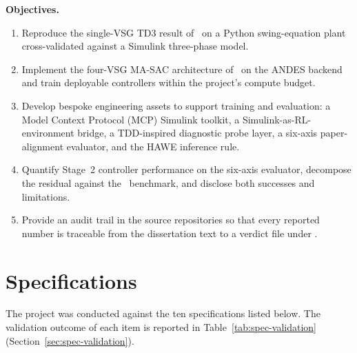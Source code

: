\documentclass{unnc-fyp}
\begin{document}
\textbf{Objectives.}
\begin{enumerate}
  \item Reproduce the single-VSG TD3 result
        of~\cite{benhmidouch2024td3} on a Python swing-equation
        plant cross-validated against a Simulink three-phase
        model.
  \item Implement the four-VSG MA-SAC architecture
        of~\cite{yang2023ddic} on the ANDES backend and train
        deployable controllers within the project's compute
        budget.
  \item Develop bespoke engineering assets to support training
        and evaluation: a Model Context Protocol (MCP) Simulink
        toolkit, a Simulink-as-RL-environment bridge, a
        TDD-inspired diagnostic probe layer, a six-axis
        paper-alignment evaluator, and the HAWE inference rule.
  \item Quantify Stage~2 controller performance on the six-axis
        evaluator, decompose the residual against
        the~\cite{yang2023ddic} benchmark, and disclose both
        successes and limitations.
  \item Provide an audit trail in the source repositories so
        that every reported number is traceable from the
        dissertation text to a verdict file under
        .
\end{enumerate}

\section{Specifications}
\label{sec:specifications}

The project was conducted against the ten specifications listed
below.
The validation outcome of each item is reported in
Table~\ref{tab:spec-validation}
(Section~\ref{sec:spec-validation}).
\end{document}
